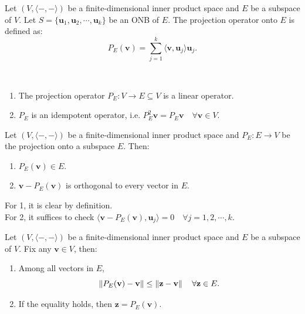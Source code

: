 \documentclass[12pt]{article}
\begin{document}
\begin{definition}
    Let $(V,\langle-,-\rangle)$ be a finite-dimensional inner product space and $E$ be a subspace of $V$.
    Let $S=\{\mathbf{u}_1,\mathbf{u}_2,\cdots,\mathbf{u}_k\}$ be an ONB of $E$. The projection operator onto $E$ is defined as:
    \[P_E(\mathbf{v})=\sum_{j=1}^{k}\langle \mathbf{v}, \mathbf{u}_j\rangle \mathbf{u}_j.\] 
\end{definition}

\begin{remark}\
    \begin{enumerate}
        \item The projection operator $P_E:V\to E\subseteq V$ is a linear operator.
        \item $P_E$ is an idempotent operator, i.e. $P^2_E \mathbf{v} = P_E \mathbf{v}\quad\forall \mathbf{v}\in V$.
    \end{enumerate}
\end{remark}

\begin{theorem}
    Let $(V,\langle-,-\rangle)$ be a finite-dimensional inner product space and $P_E:E\to V$ be the projection onto a subspace $E$.
    Then:
    \begin{enumerate}
        \item $P_E(\mathbf{v})\in E$.
        \item $\mathbf{v}-P_E(\mathbf{v})$ is orthogonal to every vector in $E$.
    \end{enumerate}
\end{theorem}

\begin{pfbox}
    For 1, it is clear by definition.\\
    For 2, it suffices to check $\langle \mathbf{v}-P_E(\mathbf{v}), \mathbf{u}_j\rangle=0\quad \forall j=1,2,\cdots,k.$
\end{pfbox}

\begin{theorem}
 Let $(V,\langle-,-\rangle)$ be a finite-dimensional inner product space and $E$ be a subspace of $V$.
 Fix any $\mathbf{v}\in V$, then:
 \begin{enumerate}
    \item Among all vectors in $E$,
    $$\left\lVert P_E(\mathbf{v})-\mathbf{v} \right\rVert\le\left\lVert \mathbf{z}-\mathbf{v} \right\rVert\quad \forall \mathbf{z}\in E.$$
    \item If the equality holds, then $\mathbf{z}=P_E(\mathbf{v}).$
 \end{enumerate}
\end{theorem}
\end{document}
